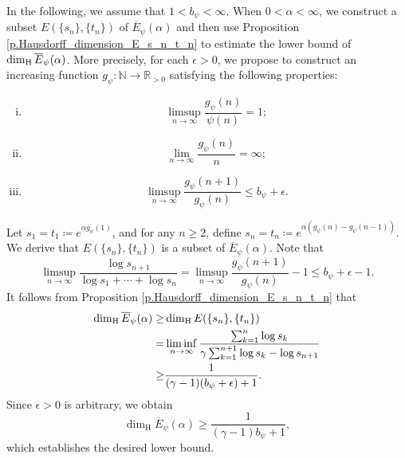 \documentclass[12pt,reqno]{amsart}
\renewcommand{\=}{\coloneqq}
\theoremstyle{plain}
\begin{document}
In the following, we assume that $1<b_\psi<\infty$. When $0<\alpha<\infty$, we construct a subset $E(\{s_n\}, \{t_n\})$ of $\overline{E}_{\psi}(\alpha)$ and then use Proposition \ref{p.Hausdorff_dimension_E_s_n_t_n} to estimate the lower bound of $\dim_{\rm H}\overline{E}_{\psi}(\alpha)$. More precisely, for each $\epsilon>0$, we propose to construct an increasing function $g_{\psi}: \mathbb{N}\rightarrow \mathbb{R}_{>0}$ satisfying
    the following properties:
    \begin{enumerate}[(i).]
    \item \begin{equation*}\label{e.condition_i}
        \limsup_{n \to \infty}\frac{g_{\psi}(n)}{\psi (n)}=1;
    \end{equation*}
    \item \begin{equation*}\label{e.condition_ii}
        \lim_{n \to \infty}\frac{g_{\psi}(n)}{n}=\infty;
    \end{equation*}
    \item \begin{equation*}\label{e.condition_iii}
        \limsup_{n \to \infty}\frac{g_{\psi}(n+1)}{g_{\psi}(n)}
        \leq b_\psi+\epsilon.
    \end{equation*}
    \end{enumerate}
Let $s_1=t_1\coloneqq e^{\alpha g_{\psi}(1)}$, and for any $n \geq 2$, define $s_n=t_n \coloneqq e^{\alpha(g_{\psi}(n)-g_{\psi}(n-1))}$. We derive that $E(\{s_n\}, \{t_n\})$ is a subset of $\overline{E}_{\psi}(\alpha)$.
Note that
\[
\limsup_{n \to \infty} \frac{\log s_{n+1}}{\log s_1+\cdots +\log s_n} = \limsup_{n \to \infty}
         \frac{g_{\psi}(n+1)}{g_{\psi}(n)}-1 \leq b_\psi+\epsilon -1.
\]
It follows from Proposition \ref{p.Hausdorff_dimension_E_s_n_t_n} that
    \begin{alignat}{2}
        \dim_{\mathrm{H}}\overline{E}_{\psi}(\alpha)
         \geq&  \dim_{\mathrm{H}}E (\{s_n\},\{t_n\})\notag\\
         =& \liminf _{n\to \infty}
                \frac{\sum_{k=1}^n\log s_k}
                {\gamma\sum_{k=1}^{n+1}\log s_k-\log s_{n+1}}\notag\\
\geq& \frac{1}{(\gamma-1)(b_\psi+\epsilon)+1} . \label{lowalpha}
    \end{alignat}
Since $\epsilon>0$ is arbitrary, we obtain
    \begin{equation*}
        \dim_{\mathrm{H}}\overline{E}_{\psi}(\alpha)
         \geq  \frac{1}{(\gamma-1)b_\psi+1},
    \end{equation*}
which establishes the desired lower bound.
\end{document}
